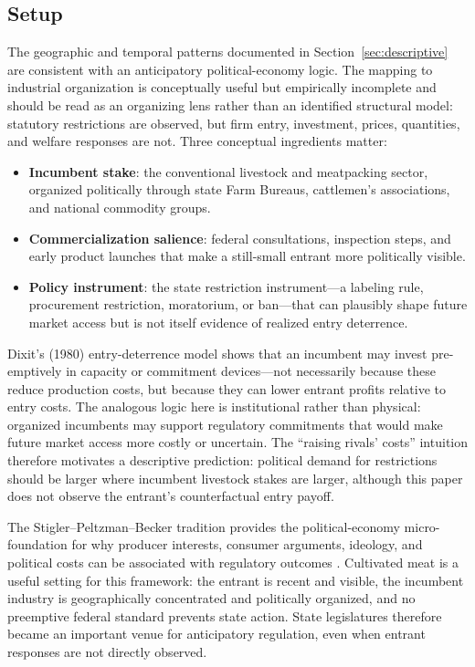 \documentclass[12pt]{article}
\begin{document}
\subsection{Setup}

The geographic and temporal patterns documented in Section~\ref{sec:descriptive} are consistent with an anticipatory political-economy logic.  The mapping to industrial organization is conceptually useful but empirically incomplete and should be read as an organizing lens rather than an identified structural model: statutory restrictions are observed, but firm entry, investment, prices, quantities, and welfare responses are not.  Three conceptual ingredients matter:

\begin{itemize}
    \item \textbf{Incumbent stake}: the conventional livestock and meatpacking sector, organized politically through state Farm Bureaus, cattlemen's associations, and national commodity groups.
    \item \textbf{Commercialization salience}: federal consultations, inspection steps, and early product launches that make a still-small entrant more politically visible.
    \item \textbf{Policy instrument}: the state restriction instrument---a labeling rule, procurement restriction, moratorium, or ban---that can plausibly shape future market access but is not itself evidence of realized entry deterrence.
\end{itemize}

Dixit's (1980) entry-deterrence model shows that an incumbent may invest pre-emptively in capacity or commitment devices---not necessarily because these reduce production costs, but because they can lower entrant profits relative to entry costs.  The analogous logic here is institutional rather than physical: organized incumbents may support regulatory commitments that would make future market access more costly or uncertain.  The ``raising rivals' costs'' intuition \citep{salop1983raising, milgrom1982predation} therefore motivates a descriptive prediction: political demand for restrictions should be larger where incumbent livestock stakes are larger, although this paper does not observe the entrant's counterfactual entry payoff.

The Stigler--Peltzman--Becker tradition provides the political-economy micro-foundation for why producer interests, consumer arguments, ideology, and political costs can be associated with regulatory outcomes \citep{stigler1971theory, peltzman1976toward, becker1983theory}.  Cultivated meat is a useful setting for this framework: the entrant is recent and visible, the incumbent industry is geographically concentrated and politically organized, and no preemptive federal standard prevents state action.  State legislatures therefore became an important venue for anticipatory regulation, even when entrant responses are not directly observed.
\end{document}
